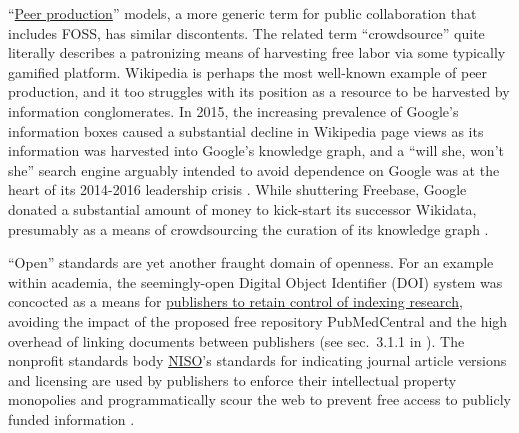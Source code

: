 ``\href{https://en.wikipedia.org/wiki/Peer_production}{Peer
production}'' models, a more generic term for public collaboration that
includes FOSS, has similar discontents. The related term
``crowdsource'' quite literally
describes a patronizing means of harvesting free labor via some
typically gamified platform. Wikipedia is perhaps the most well-known
example of peer production,
and it too struggles with its position as a resource to be harvested by
information conglomerates. In 2015, the increasing prevalence of
Google's information boxes caused a substantial decline in Wikipedia
page views \cite{UserTalkJimbo2015, hinkisGoogleSteals5502015}  as
its information was harvested into Google's knowledge graph, and a
``will she, won't she'' search engine arguably intended to avoid
dependence on Google was at the heart of its 2014-2016 leadership crisis
\cite{whiteWikimediaTimelineEvents2016, buetlerSearchDestroyKnowledge2016} . While shuttering Freebase,
Google donated a substantial amount of money to kick-start its successor
\cite{pellissiertanonFreebaseWikidataGreat2016}  Wikidata,
presumably as a means of crowdsourcing the curation of its knowledge
graph \cite{wikimediameta-wikiGoogleMeta, GoogleStakeWikidata2019, vrandecicWikidataFreeCollaborative2014} .

``Open'' standards are yet another fraught domain of openness. For an
example within academia, the seemingly-open Digital Object Identifier
(DOI) system was concocted as a means for
\href{https://jon-e.net/infrastructure/\#seemingly-prosocial-protocols-can-be-used-by-industries-to-preem}{publishers
to retain control of indexing research}, avoiding the impact of the
proposed free repository PubMedCentral and the high overhead of linking
documents between publishers (see sec.~3.1.1 in \cite{saundersDecentralizedInfrastructureNeuro2022} ). The nonprofit
standards body \href{https://www.niso.org}{NISO}'s standards for
indicating journal article versions \cite{nisoRP82008JournalArticle2008}  and licensing \cite{nisoRP222021AccessLicense2021}  are used by publishers to enforce
their intellectual property monopolies and programmatically scour the
web to prevent free access to publicly funded information \cite{carpenterNewArticleSharing2021} .

